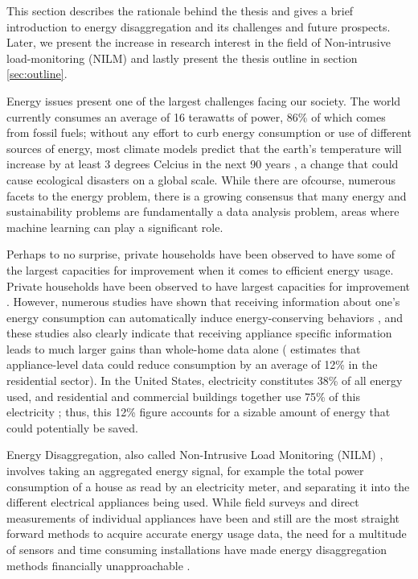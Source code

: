 This section describes the rationale behind the thesis and gives a brief introduction to energy disaggregation and its challenges and future prospects. Later, we present the increase in research interest in the field of Non-intrusive load-monitoring (NILM) and lastly present the thesis outline in section \ref{sec:outline}.

Energy issues present one of the largest challenges facing our society. The world currently consumes an average of 16 terawatts of power, 86\% of which comes from fossil fuels; without any effort to curb energy consumption or use of different sources of energy, most climate models predict that the earth’s temperature will increase by at least 3 degrees Celcius in the next 90 years \cite{DDSC}, a change that could cause ecological disasters on a global scale. While there are ofcourse, numerous facets to the energy problem, there is a growing consensus that many energy and sustainability problems are fundamentally a data analysis problem, areas where machine learning can play a significant role.

Perhaps to no surprise, private households have been observed to have some of the largest capacities for improvement when it comes to efficient energy usage. Private households have been observed to have largest capacities for improvement \cite{commision}. However, numerous studies have shown that receiving information about one's energy consumption can automatically induce energy-conserving behaviors \cite{DDSC}, and these studies also clearly indicate that receiving appliance specific information leads to much larger gains than whole-home data alone (\hspace{1sp}\cite{reduce} estimates that appliance-level data could reduce consumption by an average of 12\% in the residential sector). In the United States, electricity constitutes 38\% of all energy used, and residential and commercial buildings together use 75\% of this electricity \cite{DDSC}; thus, this 12\% figure accounts for a sizable amount of energy that could potentially be saved.

Energy Disaggregation, also called Non-Intrusive Load Monitoring (NILM) \cite{hart}, involves taking an aggregated energy signal, for example the total power consumption of a house as read by an electricity meter, and separating it into the different electrical appliances being used. While field surveys and direct measurements of individual appliances have been and still are the most straight forward methods to acquire accurate energy usage data, the need for a multitude of sensors and time consuming installations have made energy disaggregation methods financially unapproachable \cite{jon}. 

